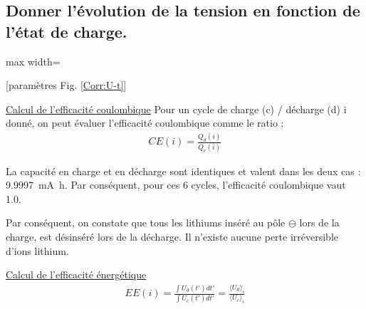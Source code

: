 \documentclass[twoside,a4paper,11pt,addpoints]{exam}%
\begin{document}
\begin{questions}
\begin{parts}
\part {\color{purple} Donner l'évolution de la tension en fonction de l'état de charge.}
\begin{mybox}
\begin{solution}[6cm]
\begin{center}
\begin{adjustbox}{max width=\textwidth}

\end{adjustbox}
[paramètres Fig. \ref{Corr:U-t}]
\end{center}
\end{solution}
\end{mybox}
\end{parts}



\begin{mybox}\begin{solution}[4cm]
\underline{Calcul de l'efficacité coulombique} Pour un cycle de charge (c) / décharge (d) i donné, on peut évaluer l'efficacité coulombique comme le ratio : 
\begin{align*}
CE (i)= \frac{Q_d (i)}{Q_c (i)}
\end{align*}

La capacité en charge et en décharge sont identiques et valent dans les deux cas : \SI{9.9997}{\milli\ampere\hour}. Par conséquent, pour ces 6 cycles, l'efficacité coulombique vaut 1.0.

Par conséquent, on constate que tous les lithiums inséré au pôle $\ominus$ lors de la charge, est désinséré lors de la décharge. Il n'existe aucune perte irréversible d'ions lithium.
\end{solution}\end{mybox}

\begin{mybox}\begin{solution}[6cm]
\underline{Calcul de l'efficacité énergétique}
\begin{align*}
EE(i) = \frac{\int U_d (t') dt'}{\int U_c (t') dt'} = \frac{\langle U_d \rangle_i}{\langle U_c \rangle_i}
\end{align*}


\end{solution}
\end{mybox}
\end{questions}
\end{document}
